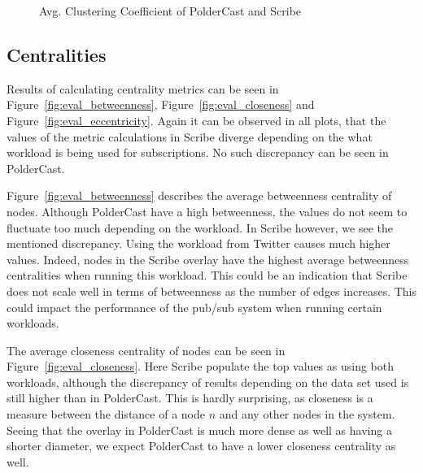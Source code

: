 \begin{figure}[H]
    \centering
    
    \caption{Avg. Clustering Coefficient of PolderCast and Scribe}
    \label{fig:eval_cc}
\end{figure}

\subsection{Centralities}

Results of calculating centrality metrics can be seen in
Figure~\ref{fig:eval_betweenness}, Figure~\ref{fig:eval_closeness} and
Figure~\ref{fig:eval_eccentricity}. Again it can be observed in all
plots, that the values of the metric calculations in Scribe diverge
depending on the what workload is being used for subscriptions. No such
discrepancy can be seen in PolderCast.

Figure~\ref{fig:eval_betweenness} describes the average betweenness
centrality of nodes. Although PolderCast have a high betweenness, the
values do not seem to fluctuate too much depending on the workload. In
Scribe however, we see the mentioned discrepancy. Using the workload
from Twitter causes much higher values. Indeed, nodes in the Scribe
overlay have the highest average betweenness centralities when running
this workload. This could be an indication that Scribe does not scale
well in terms of betweenness as the number of edges increases. This
could impact the performance of the pub/sub system when running certain
workloads.

The average closeness centrality of nodes can be seen in
Figure~\ref{fig:eval_closeness}. Here Scribe populate the top values as
using both workloads, although the discrepancy of results depending on
the data set used is still higher than in PolderCast. This is hardly
surprising, as closeness is a measure between the distance of a node
$n$ and any other nodes in the system. Seeing that the overlay in
PolderCast is much more dense as well as having a shorter diameter, we
expect PolderCast to have a lower closeness centrality as well.


